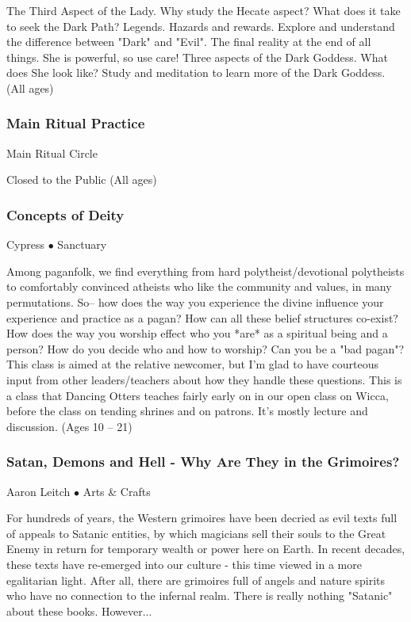  The Third Aspect of the Lady.  Why study the Hecate aspect? What does it take to seek the Dark Path?  Legends.  Hazards and rewards.  Explore and understand the difference between "Dark" and "Evil".  The final reality at the end of all things.  She is powerful, so use care! Three aspects of the Dark Goddess.  What does She look like?  Study and meditation to learn more of the Dark Goddess. {\small (All ages)}

\subsubsection{Main Ritual Practice}
\label{Sat-Prac4}
{\small  Main Ritual Circle}

 Closed to the Public {\small (All ages)}

\subsubsection{Concepts of Deity}
\label{Sat-Cypress3}
{\small Cypress $\bullet$  Sanctuary}

 Among paganfolk, we find everything from hard polytheist/devotional polytheists to comfortably convinced atheists who like the community and values, in many permutations. So-- how does the way you experience the divine influence your experience and practice as a pagan? How can all these belief structures co-exist? How does the way you worship effect who you *are* as a spiritual being and a person? How do you decide who and how to worship? Can you be a "bad pagan"? This class is aimed at the relative newcomer, but I'm glad to have courteous input from other leaders/teachers about how they handle these questions. This is a class that Dancing Otters teaches fairly early on in our open class on Wicca, before the class on tending shrines and on patrons. It's mostly lecture and discussion. {\small (Ages 10 -- 21)}

\subsubsection{Satan, Demons and Hell - Why Are They in the Grimoires?}
\label{Sat-Leitch3}
{\small Aaron Leitch $\bullet$  Arts \& Crafts}

 For hundreds of years, the Western grimoires have been decried as evil texts full of appeals to Satanic entities, by which magicians sell their souls to the Great Enemy in return for temporary wealth or power here on Earth.  In recent decades, these texts have re-emerged into our culture - this time viewed in a more egalitarian light.  After all, there are grimoires full of angels and nature spirits who have no connection to the infernal realm.  There is really nothing "Satanic" about these books.  However...

